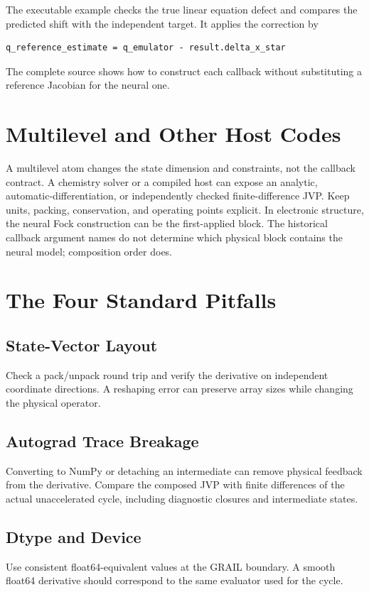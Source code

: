 The executable example checks the true linear equation defect and compares
the predicted shift with the independent target. It applies the correction by
\begin{lstlisting}[style=grailInStyle]
q_reference_estimate = q_emulator - result.delta_x_star
\end{lstlisting}
The complete source shows how to construct each callback without substituting
a reference Jacobian for the neural one.

\section{Multilevel and Other Host Codes}
\label{sec:threelevel-worked}
\label{sec:your-host}
A multilevel atom changes the state dimension and constraints, not the
callback contract. A chemistry solver or a compiled host can expose an
analytic, automatic-differentiation, or independently checked finite-difference
JVP. Keep units, packing, conservation, and operating points explicit.
In electronic structure, the neural Fock construction can be the first-applied
block. The historical callback argument names do not determine which physical
block contains the neural model; composition order does.

\section{The Four Standard Pitfalls}
\label{sec:pitfalls}
\subsection{State-Vector Layout}
\label{pit:layout}
Check a pack/unpack round trip and verify the derivative on independent
coordinate directions. A reshaping error can preserve array sizes while
changing the physical operator.
\subsection{Autograd Trace Breakage}
\label{pit:autograd}
Converting to NumPy or detaching an intermediate can remove physical feedback
from the derivative. Compare the composed JVP with finite differences of the
actual unaccelerated cycle, including diagnostic closures and intermediate states.
\subsection{Dtype and Device}
\label{pit:dtype}
Use consistent float64-equivalent values at the GRAIL boundary. A smooth
float64 derivative should correspond to the same evaluator used for the cycle.
